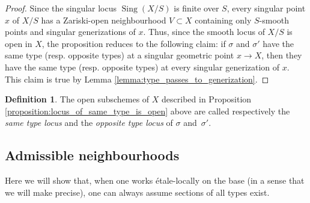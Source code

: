 \documentclass[a4paper,12pt]{amsart} %
\numberwithin{equation}{subsection}
\def\Sing{\operatorname{Sing}}
\theoremstyle{definition}
\newtheorem{definition}{Definition}[section]
\theoremstyle{plain}%
\newtheorem{lemma}[definition]{Lemma}
\theoremstyle{remark}
\begin{document}
\begin{proof}
Since the singular locus $\Sing(X/S)$ is finite over $S$, every singular point $x$ of $X/S$ has a Zariski-open neighbourhood $V\subset X$ containing only $S$-smooth points and singular generizations of $x$. Thus, since the smooth locus of $X/S$ is open in $X$, the proposition reduces to the following claim: if $\sigma$ and $\sigma'$ have the same type (resp. opposite types) at a singular geometric point $x\to X$, then they have the same type (resp. opposite types) at every singular generization of $x$. This claim is true by Lemma \ref{lemma:type_passes_to_generization}.
\end{proof}

\begin{definition}\label{definition:same_type_opposite_type_locus}
The open subschemes of $X$ described in Proposition \ref{proposition:locus_of_same_type_is_open} above are called respectively the \emph{same type locus} and the \emph{opposite type locus} of $\sigma$ and~$\sigma'$.
\end{definition}


\subsection{Admissible neighbourhoods}

Here we will show that, when one works \'etale-locally on the base (in a sense that we will make precise), one can always assume sections of all types exist.


\end{document}
